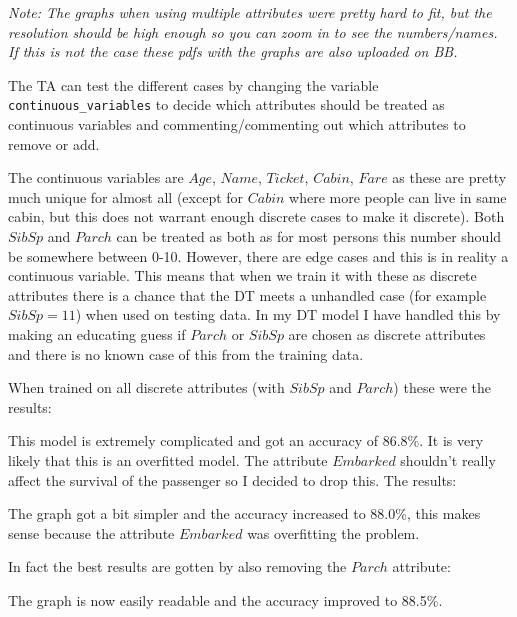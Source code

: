 \documentclass[11pt, english]{../Template/NTNUoving}
\begin{document}
\textit{Note: The graphs when using multiple attributes were pretty hard to fit, but the resolution should be high enough so you can zoom in to see the numbers/names.
If this is not the case these pdfs with the graphs are also uploaded on BB.}


\begin{oppgave}

    The TA can test the different cases by changing the variable \texttt{continuous\_variables} to decide which attributes should be treated as continuous variables and commenting/commenting out
    which attributes to remove or add.

    \begin{punkt}
        The continuous variables are $Age$, $Name$, $Ticket$, $Cabin$, $Fare$ as these are pretty much
        unique for almost all (except for $Cabin$ where more people can live in same cabin, but this does not warrant enough discrete cases to make it discrete). Both $SibSp$ and $Parch$ can be treated as
        both as for most persons this number should be somewhere between 0-10. However, there are edge cases and this is in reality a continuous variable. This means that when we train it
        with these as discrete attributes there is a chance that the DT meets a unhandled case (for example $SibSp = 11$) when used on testing data.
        In my DT model I have handled this by making an educating guess if $Parch$ or $SibSp$ are chosen as discrete attributes and there is no known case of this from the
        training data.

        When trained on all discrete attributes (with $SibSp$ and $Parch$) these were the results:
        

        This model is extremely complicated and got an accuracy of 86.8\%. It is very likely that this is an overfitted model.
        The attribute $Embarked$ shouldn't really affect the survival of the passenger so I decided to drop this. The results:
        

        The graph got a bit simpler and the accuracy increased to 88.0\%, this makes sense because
        the attribute $Embarked$ was overfitting the problem.

        In fact the best results are gotten by also removing the $Parch$ attribute:
        

        The graph is now easily readable and the accuracy improved to 88.5\%.


\end{punkt}
\end{oppgave}
\end{document}
